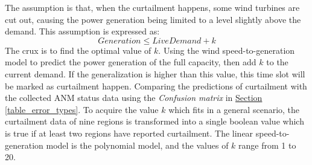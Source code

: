 \documentclass[12pt,a4paper]{report}
\begin{document}
                    The assumption is that, when the curtailment happens, some wind turbines are cut out, causing the power generation being limited to a level slightly above the demand.
                    This assumption is expressed as:
                    \begin{equation}
                        Generation \leq Live Demand + k
                        \label{equation_Generation_to_demand_curtailment}
                    \end{equation}
                    The crux is to find the optimal value of $k$. Using the wind speed-to-generation model to predict the power generation of the full capacity, then add $k$ to the current demand. If the generalization is higher than this value, this time slot will be marked as curtailment happen. Comparing the predictions of curtailment with the collected ANM status data using the \emph{Confusion matrix} in \hyperref[table_error_types]{Section \ref*{table_error_types}}.
                    To acquire the value $k$ which fits in a general scenario, the curtailment data of nine regions is transformed into a single boolean value which is true if at least two regions have reported curtailment. The linear speed-to-generation model is the polynomial model, and the values of $k$ range from 1 to 20.
\end{document}
